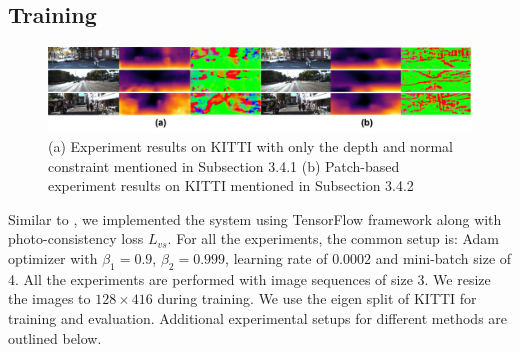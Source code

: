 \documentclass[10pt,twocolumn,letterpaper]{article}
\begin{document}
\subsection{Training}
\begin{figure}[ht]
  \includegraphics[width=\linewidth]{depth_KITTI.png}
  \caption{(a) Experiment results on KITTI with only the depth and normal constraint mentioned in Subsection 3.4.1 (b) Patch-based experiment results on KITTI mentioned in Subsection 3.4.2}
\label{normal:depth}
\end{figure}

Similar to \cite{zhou2017unsupervised}, we implemented the system using TensorFlow framework along with photo-consistency loss $L_{vs}$. For all the experiments, the common setup is: Adam optimizer with $\beta_1 = 0.9$, $\beta_2 = 0.999$, learning rate of $0.0002$ and mini-batch size of 4. All the experiments are performed with image sequences of size 3. We resize the images to $128 \times 416$ during training. We use the eigen split of KITTI for training and evaluation. Additional experimental setups for different methods are outlined below.
\end{document}
